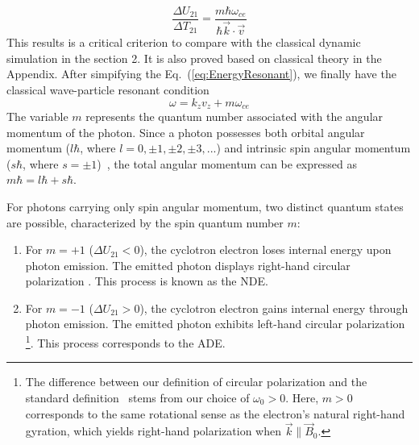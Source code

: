 \documentclass{cpbtex3}
\begin{document}
\begin{equation}
\frac{\Delta U_{21}}{\Delta T_{21}} = \frac{m \hbar \omega_{ce}}{\hbar \vec{k} \cdot \vec{v}}  \label{eq:DU21DT21}
\end{equation}
 This results is a critical criterion to compare with the classical dynamic simulation in the section 2. It is also proved based on classical theory in the Appendix.
After simpifying the Eq.~(\ref{eq:EnergyResonant}), we finally have the classical wave-particle resonant condition 
\begin{equation}
\omega = k_z v_z + m \omega_{ce}
\end{equation}
The variable \( m \) represents the quantum number associated with the angular momentum of the photon. Since a photon possesses both orbital angular momentum (\( l\hbar\), where \(l = 0,\pm1,\pm2,\pm3,... \)) and intrinsic spin angular momentum (\( s\hbar \), where \( s = \pm 1 \))~\cite{arnaut2000orbital}, the total angular momentum can be expressed as \( m\hbar = l\hbar + s\hbar \). 

For photons carrying only spin angular momentum, two distinct quantum states are possible, characterized by the spin quantum number $m$:

\begin{enumerate}
\item For $m=+1$ ($\Delta U_{21}<0$), the cyclotron electron loses internal energy upon photon emission. The emitted photon displays right-hand circular polarization . This process is known as the NDE. 

\item For $m=-1$ ($\Delta U_{21}>0$), the cyclotron electron gains internal energy through photon emission. The emitted photon exhibits left-hand circular polarization \footnote{The difference between our definition of circular polarization and the standard definition~\cite{kiang2008angular} stems from our choice of $\omega_0 > 0$. Here, $m > 0$ corresponds to the same rotational sense as the electron's natural right-hand gyration, which yields right-hand polarization when $\vec{k} \parallel \vec{B}_0$.}. This process corresponds to the ADE.
\end{enumerate}
\end{document}
